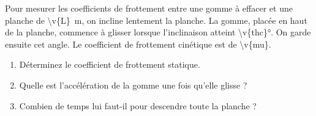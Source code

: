 Pour mesurer les coefficients de frottement entre une gomme à effacer et une planche de \qty{\v{L}}{m}, on incline lentement la planche. La gomme, placée en haut de la planche, commence à glisser lorsque l'inclinaison atteint \ang{\v{thc}}. On garde ensuite cet angle. Le coefficient de frottement cinétique est de \num{\v{mu}}.

\begin{enumerate}[label=\alph*)]
    \item Déterminez le coefficient de frottement statique.
    \item Quelle est l'accélération de la gomme une fois qu'elle glisse ?
    \item Combien de temps lui faut-il pour descendre toute la planche ?
\end{enumerate}
